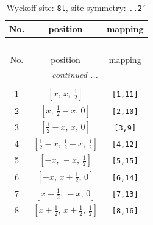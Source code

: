 \documentclass[fleqn,8pt]{jsarticle}
\begin{document}
\begin{longtable}{ccc}
\caption{Wyckoff site: {\tt 8l}, site symmetry: {\tt ..2'}}
 \\
 \hline \hline
No. & position & mapping \\ \hline \endfirsthead

\multicolumn{2}{l}{\tablename\ \thetable{}} \\
 \hline \hline
No. & position & mapping \\ \hline \endhead

 \hline \hline
\multicolumn{2}{r}{\footnotesize\it continued ...} \\ \endfoot

 \hline \hline
\multicolumn{2}{r}{} \\ \endlastfoot

1 & $\left[ x,\, x,\, \frac{1}{2} \right]$ & {\tt [1,11]} \\ \hline
2 & $\left[ x,\, \frac{1}{2} - x,\, 0 \right]$ & {\tt [2,10]} \\ \hline
3 & $\left[ \frac{1}{2} - x,\, x,\, 0 \right]$ & {\tt [3,9]} \\ \hline
4 & $\left[ \frac{1}{2} - x,\, \frac{1}{2} - x,\, \frac{1}{2} \right]$ & {\tt [4,12]} \\ \hline
5 & $\left[ - x,\, - x,\, \frac{1}{2} \right]$ & {\tt [5,15]} \\ \hline
6 & $\left[ - x,\, x + \frac{1}{2},\, 0 \right]$ & {\tt [6,14]} \\ \hline
7 & $\left[ x + \frac{1}{2},\, - x,\, 0 \right]$ & {\tt [7,13]} \\ \hline
8 & $\left[ x + \frac{1}{2},\, x + \frac{1}{2},\, \frac{1}{2} \right]$ & {\tt [8,16]} \\
\end{longtable}
\renewcommand{\arraystretch}{1.2}
\end{document}
